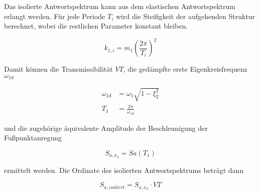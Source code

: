 Das isolierte Antwortspektrum kann aus dem elastischen Antwortspektrum erlangt werden.
Für jede Periode $T_i$ wird die Steifigkeit der aufgehenden Struktur berechnet, wobei die restlichen Parameter konstant bleiben.

\begin{equation}
k_{1,i} = m_1 (\frac{2 \pi}{T_i})^2
\end{equation}
  
Damit können die Transmissibilität $VT$, die gedämpfte erste Eigenkreisfrequenz $\omega_{1d}$

\begin{align}
\omega_{1d} &= \omega_1 \sqrt{1 - \xi_2^2} \\
T_1 &= \frac{2 \pi}{\omega_{1d}}
\end{align}

und die zugehörige äquivalente Amplitude der Beschleunigung der Fußpunktanregung

\begin{equation}
S_{a,x_3} = Sa(T_1)
\end{equation}

ermittelt werden. Die Ordinate des isolierten Antwortspektrums beträgt dann

\begin{equation}
S_{a,isoliert} = S_{a,x_3} \cdot VT
\end{equation}
  
\pagebreak
